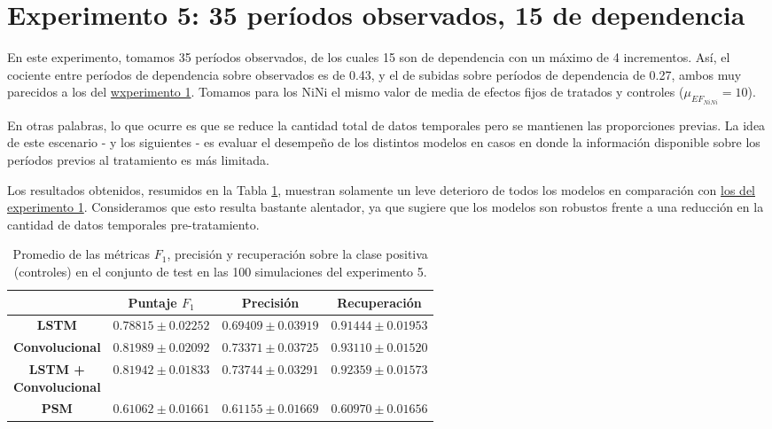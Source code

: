 \documentclass[../../main.tex]{subfiles}
\begin{document}
\section{Experimento 5: 35 períodos observados, 15 de dependencia} \label{sec:exp5}
En este experimento, tomamos 35 períodos observados, de los cuales 15 son de dependencia
con un máximo de 4 incrementos. Así, el cociente entre períodos de dependencia sobre
observados es de 0.43, y el de subidas sobre períodos de dependencia de 0.27, ambos muy
parecidos a los del \hyperref[sec:exp1]{wxperimento 1}. Tomamos para los NiNi el mismo
valor de media de efectos fijos de tratados y controles (\(\mu_{{EF}_{NiNi}} = 10\)).

En otras palabras, lo que ocurre es que se reduce la cantidad total de datos temporales
pero se mantienen las proporciones previas. La idea de este escenario - y los siguientes -
es evaluar el desempeño de los distintos modelos en casos en donde la información
disponible sobre los períodos previos al tratamiento es más limitada.

Los resultados obtenidos, resumidos en la Tabla \ref{tab:results_exp5}, muestran solamente
un leve deterioro de todos los modelos en comparación con \hyperref[tab:results_exp1]{los
del experimento 1}. Consideramos que esto resulta bastante alentador, ya que sugiere que
los modelos son robustos frente a una reducción en la cantidad de datos temporales
pre-tratamiento.

\begin{table}[H]
    \centering
    \renewcommand{\arraystretch}{1.2}
    \begin{tabular}{|c|c|c|c|}
        \hline
         & \textbf{Puntaje} \(F_1\) & \textbf{Precisión} & \textbf{Recuperación} \\ \hline\hline
        \textbf{LSTM}
            & $0.78815 \pm 0.02252$ & $0.69409 \pm 0.03919$ & $0.91444 \pm 0.01953$ \\ \hline
        \textbf{Convolucional}
            & $\mathbf{0.81989 \pm 0.02092}$ & $0.73371 \pm 0.03725$ & $\mathbf{0.93110 \pm 0.01520}$ \\ \hline
        \makecell{\textbf{LSTM +} \\ \textbf{Convolucional}}
            & $0.81942 \pm 0.01833$ & $\mathbf{0.73744 \pm 0.03291}$ & $0.92359 \pm 0.01573$ \\ \hline
        \textbf{PSM}
            & $0.61062 \pm 0.01661$ & $0.61155 \pm 0.01669$ & $0.60970 \pm 0.01656$ \\
        \hline
    \end{tabular}
    \caption{Promedio de las métricas \(F_1\), precisión y recuperación sobre la
    clase positiva (controles) en el conjunto de test en las 100 simulaciones del
    experimento 5.}
    \label{tab:results_exp5}
\end{table}
\end{document}
